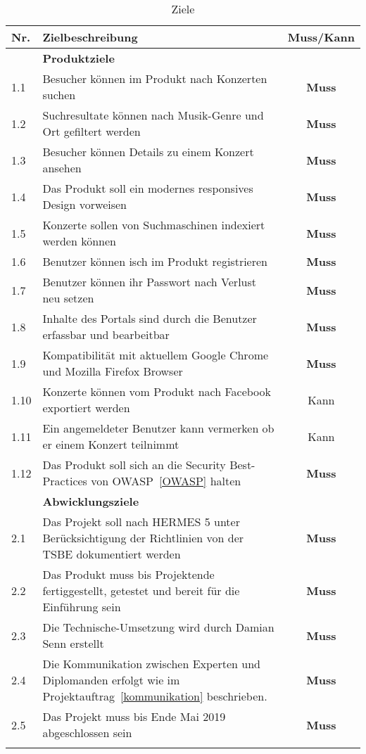 \begin{longtable}[]{@{}lp{10.5cm}c@{}}
  \toprule
  Nr.  & Zielbeschreibung                                                                                                   & Muss/Kann\tabularnewline
  \toprule
       & \textbf{Produktziele}\tabularnewline
  \midrule
  1.1  & Besucher können im Produkt nach Konzerten suchen                                                                   & \textbf{Muss}\tabularnewline
  1.2  & Suchresultate können nach Musik-Genre und Ort gefiltert werden                                                     & \textbf{Muss}\tabularnewline
  1.3  & Besucher können Details zu einem Konzert ansehen                                                                   & \textbf{Muss}\tabularnewline
  1.4  & Das Produkt soll ein modernes responsives Design vorweisen                                                         & \textbf{Muss}\tabularnewline
  1.5  & Konzerte sollen von Suchmaschinen indexiert werden können                                                          & \textbf{Muss}\tabularnewline
  1.6  & Benutzer können isch im Produkt registrieren                                                                       & \textbf{Muss}\tabularnewline
  1.7  & Benutzer können ihr Passwort nach Verlust neu setzen                                                               & \textbf{Muss}\tabularnewline
  1.8  & Inhalte des Portals sind durch die Benutzer erfassbar und bearbeitbar                                              & \textbf{Muss}\tabularnewline
  1.9  & Kompatibilität mit aktuellem Google Chrome und Mozilla Firefox Browser                                             & \textbf{Muss}\tabularnewline
  1.10 & Konzerte können vom Produkt nach Facebook exportiert werden                                                        & Kann\tabularnewline
  1.11 & Ein angemeldeter Benutzer kann vermerken ob er einem Konzert teilnimmt                                             & Kann\tabularnewline
  1.12 & Das Produkt soll sich an die Security Best-Practices von OWASP~\ref{OWASP} halten                                              & \textbf{Muss}\tabularnewline
  \toprule
       & \textbf{Abwicklungsziele}\tabularnewline
  \midrule
  2.1  & Das Projekt soll nach HERMES 5 unter Berücksichtigung der Richtlinien von der TSBE dokumentiert werden             & \textbf{Muss}\tabularnewline
  2.2  & Das Produkt muss bis Projektende fertiggestellt, getestet und bereit für die Einführung sein                       & \textbf{Muss}\tabularnewline
  2.3  & Die Technische-Umsetzung wird durch Damian Senn erstellt                                                           & \textbf{Muss}\tabularnewline
  2.4  & Die Kommunikation zwischen Experten und Diplomanden erfolgt wie im Projektauftrag~\ref{kommunikation} beschrieben. & \textbf{Muss}\tabularnewline
  2.5  & Das Projekt muss bis Ende Mai 2019 abgeschlossen sein                                                              & \textbf{Muss}\tabularnewline
  \bottomrule
  \caption{Ziele}
\end{longtable}
